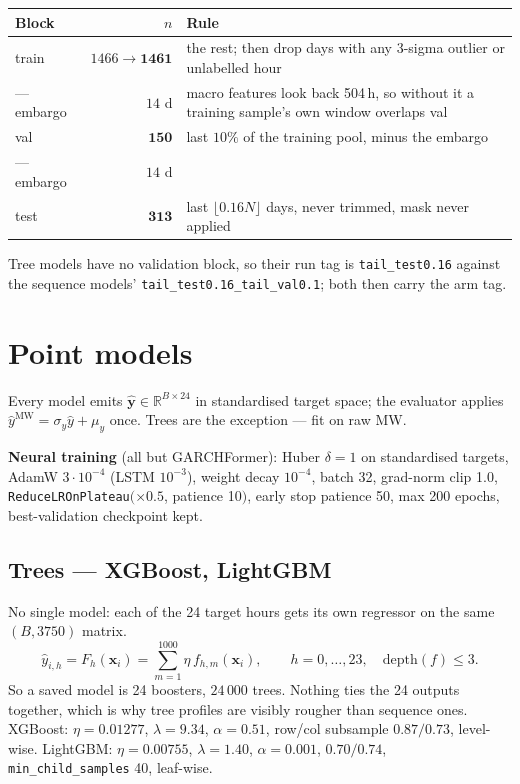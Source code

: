 \documentclass[11pt]{article}
\newcommand{\R}{\mathbb{R}}
\newcommand{\code}[1]{\texttt{\small #1}}
\begin{document}
\begin{center}\small
\begin{tabular}{@{}lrl@{}}
\toprule
Block & $n$ & Rule \\
\midrule
train & $1466 \to \mathbf{1461}$ & the rest; then drop days with any 3-sigma outlier or unlabelled hour \\
--- embargo & $14$ d & macro features look back 504\,h, so without it a training sample's own window overlaps val \\
val   & $\mathbf{150}$ & last $10\%$ of the training pool, minus the embargo \\
--- embargo & $14$ d & \\
test  & $\mathbf{313}$ & last $\lfloor 0.16N \rfloor$ days, never trimmed, mask never applied \\
\bottomrule
\end{tabular}
\end{center}

\noindent
Tree models have no validation block, so their run tag is \code{tail\_test0.16}
against the sequence models' \code{tail\_test0.16\_tail\_val0.1}; both then carry
the arm tag.

\section{Point models}

\noindent
Every model emits $\hat{\mathbf{y}} \in \R^{B\times24}$ in standardised target
space; the evaluator applies $\hat y^{\text{MW}} = \sigma_y \hat y + \mu_y$ once.
Trees are the exception --- fit on raw MW.

\noindent
\textbf{Neural training} (all but GARCHFormer): Huber $\delta=1$ on standardised
targets, AdamW $3{\cdot}10^{-4}$ (LSTM $10^{-3}$), weight decay $10^{-4}$, batch 32,
grad-norm clip 1.0, \code{ReduceLROnPlateau}$(\times0.5$, patience 10$)$, early
stop patience 50, max 200 epochs, best-validation checkpoint kept.

\subsection{Trees --- XGBoost, LightGBM}

No single model: each of the 24 target hours gets its own regressor on the same
$(B, 3750)$ matrix.
\[
\hat y_{i,h} = F_h(\mathbf{x}_i) = \sum_{m=1}^{1000}\eta\,f_{h,m}(\mathbf{x}_i),
\qquad h = 0,\ldots,23,\quad \mathrm{depth}(f) \le 3 .
\]
So a saved model is 24 boosters, $24\,000$ trees. Nothing ties the 24 outputs
together, which is why tree profiles are visibly rougher than sequence ones.
XGBoost: $\eta = 0.01277$, $\lambda = 9.34$, $\alpha = 0.51$, row/col subsample
$0.87/0.73$, level-wise. LightGBM: $\eta = 0.00755$, $\lambda = 1.40$,
$\alpha = 0.001$, $0.70/0.74$, \code{min\_child\_samples} 40, leaf-wise.
\end{document}
